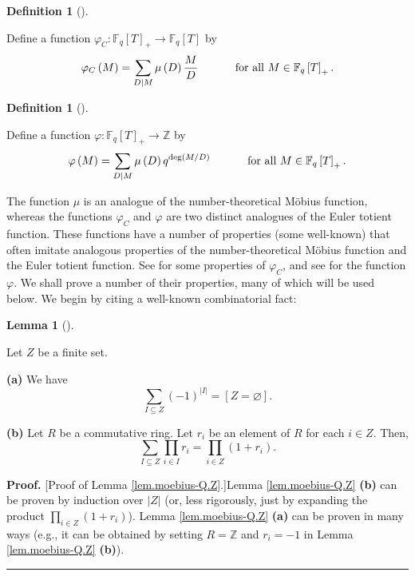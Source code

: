 \documentclass[numbers=enddot,12pt,final,onecolumn,notitlepage]{scrartcl}%
\theoremstyle{definition}
\newtheorem{lem}[theo]{Lemma}
\newenvironment{lemma}[1][]
{\begin{lem}[#1]\begin{leftbar}}
{\end{leftbar}\end{lem}}
\newtheorem{defi}[theo]{Definition}
\newenvironment{definition}[1][]
{\begin{defi}[#1]\begin{leftbar}}
{\end{leftbar}\end{defi}}
\newenvironment{proof}[1][Proof]{\noindent\textbf{#1.} }{\ \rule{0.5em}{0.5em}}
\let\sumnonlimits\sum
\let\prodnonlimits\prod
\renewcommand{\sum}{\sumnonlimits\limits}
\renewcommand{\prod}{\prodnonlimits\limits}
\begin{document}
\begin{definition}
\label{def.phiC-q}Define a function $\varphi_{C}:\mathbb{F}_{q}\left[
T\right]  _{+}\rightarrow\mathbb{F}_{q}\left[  T\right]  $ by%
\[
\varphi_{C}\left(  M\right)  =\sum\limits_{D\mid M}\mu\left(  D\right)
\dfrac{M}{D}\ \ \ \ \ \ \ \ \ \ \text{for all }M\in\mathbb{F}_{q}\left[
T\right]  _{+}.
\]

\end{definition}

\begin{definition}
\label{def.phi-q}Define a function $\varphi:\mathbb{F}_{q}\left[  T\right]
_{+}\rightarrow\mathbb{Z}$ by%
\[
\varphi\left(  M\right)  =\sum\limits_{D\mid M}\mu\left(  D\right)
q^{\deg\left(  M/D\right)  }\ \ \ \ \ \ \ \ \ \ \text{for all }M\in
\mathbb{F}_{q}\left[  T\right]  _{+}.
\]

\end{definition}

The function $\mu$ is an analogue of the number-theoretical M\"{o}bius
function, whereas the functions $\varphi_{C}$ and $\varphi$ are two distinct
analogues of the Euler totient function. These functions have a number of
properties (some well-known) that often imitate analogous properties of the
number-theoretical M\"{o}bius function and the Euler totient function. See
\cite[Theorem 4.5]{kc-carlitz} for some properties of $\varphi_{C}$, and see
\cite[Section 6]{kc-carlitz} for the function $\varphi$. We shall prove a
number of their properties, many of which will be used below. We begin by
citing a well-known combinatorial fact:

\begin{lemma}
\label{lem.moebius-Q.Z}Let $Z$ be a finite set.

\textbf{(a)} We have%
\[
\sum_{I\subseteq Z}\left(  -1\right)  ^{\left\vert I\right\vert }=\left[
Z=\varnothing\right]  .
\]


\textbf{(b)} Let $R$ be a commutative ring. Let $r_{i}$ be an element of $R$
for each $i\in Z$. Then,%
\[
\sum_{I\subseteq Z}\prod_{i\in I}r_{i}=\prod_{i\in Z}\left(  1+r_{i}\right)
.
\]

\end{lemma}

\begin{proof}
[Proof of Lemma \ref{lem.moebius-Q.Z}.]Lemma \ref{lem.moebius-Q.Z}
\textbf{(b)} can be proven by induction over $\left\vert Z\right\vert $ (or,
less rigorously, just by expanding the product $\prod_{i\in Z}\left(
1+r_{i}\right)  $). Lemma \ref{lem.moebius-Q.Z} \textbf{(a)} can be proven in
many ways (e.g., it can be obtained by setting $R=\mathbb{Z}$ and $r_{i}=-1$
in Lemma \ref{lem.moebius-Q.Z} \textbf{(b)}).
\end{proof}
\end{document}

